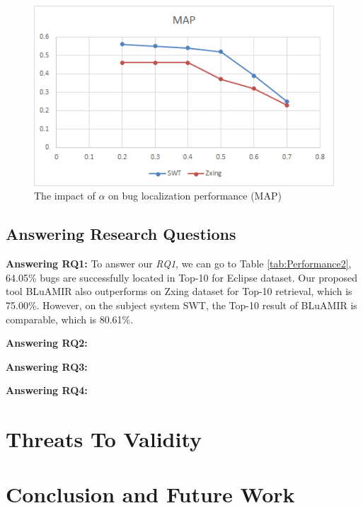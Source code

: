 \documentclass[conference]{IEEEtran}
\begin{document}
\begin{figure}
	\centering
	\includegraphics[scale=0.80]{MAP-SWT-Zxing}
	\caption{The impact of $\alpha$ on bug localization performance (MAP)}
	\label{fig:MAP}
\end{figure}
\subsection{\textbf{Answering Research Questions}}
\textbf{Answering RQ1:} To answer our \textit{RQ1}, we can go to Table \ref{tab:Performance2}, 64.05\% bugs are successfully located in Top-10 for Eclipse dataset. Our proposed tool BLuAMIR also outperforms on Zxing dataset for Top-10 retrieval, which is 75.00\%. However, on the subject system SWT, the Top-10 result of BLuAMIR is comparable, which is 80.61\%.

\textbf{Answering RQ2:}

\textbf{Answering RQ3:}

\textbf{Answering RQ4:}
\section{Threats To Validity}\label{sec:threats}


\section{Conclusion and Future Work}\label{summary}
\end{document}
